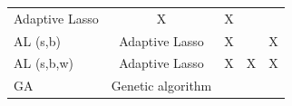 \begin{longtable}[c]{@{}lcccc@{}}
\begin{minipage}[t]{0.35\columnwidth}
Adaptive Lasso
\strut\end{minipage} &
\begin{minipage}[t]{0.11\columnwidth}\centering\strut
X
\strut\end{minipage} &
\begin{minipage}[t]{0.13\columnwidth}\centering\strut
X
\strut\end{minipage} &
\begin{minipage}[t]{0.13\columnwidth}\centering\strut
\strut\end{minipage}\tabularnewline
\begin{minipage}[t]{0.14\columnwidth}\raggedright\strut
AL (s,b)
\strut\end{minipage} &
\begin{minipage}[t]{0.35\columnwidth}\centering\strut
Adaptive Lasso
\strut\end{minipage} &
\begin{minipage}[t]{0.11\columnwidth}\centering\strut
X
\strut\end{minipage} &
\begin{minipage}[t]{0.13\columnwidth}\centering\strut
\strut\end{minipage} &
\begin{minipage}[t]{0.13\columnwidth}\centering\strut
X
\strut\end{minipage}\tabularnewline
\begin{minipage}[t]{0.14\columnwidth}\raggedright\strut
AL (s,b,w)
\strut\end{minipage} &
\begin{minipage}[t]{0.35\columnwidth}\centering\strut
Adaptive Lasso
\strut\end{minipage} &
\begin{minipage}[t]{0.11\columnwidth}\centering\strut
X
\strut\end{minipage} &
\begin{minipage}[t]{0.13\columnwidth}\centering\strut
X
\strut\end{minipage} &
\begin{minipage}[t]{0.13\columnwidth}\centering\strut
X
\strut\end{minipage}\tabularnewline
\begin{minipage}[t]{0.14\columnwidth}\raggedright\strut
GA
\strut\end{minipage} &
\begin{minipage}[t]{0.35\columnwidth}\centering\strut
Genetic algorithm
\strut\end{minipage} &
\begin{minipage}[t]{0.11\columnwidth}\centering\strut

\end{minipage}
\end{longtable}
